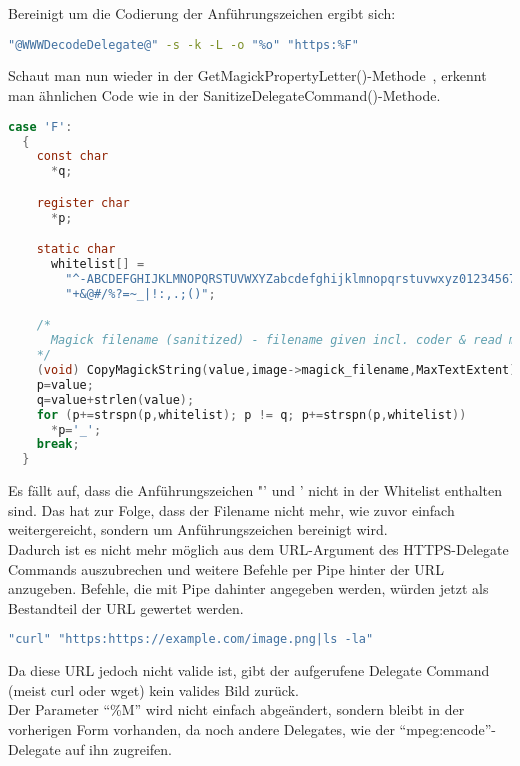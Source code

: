 Bereinigt um die Codierung der Anführungszeichen ergibt sich:

\begin{lstlisting}[firstnumber=1, language=Bash, caption=Aufgelöster https-Delegate-Befehl 6.9.3-10,label={lst:lstlisting}]
"@WWWDecodeDelegate@" -s -k -L -o "%o" "https:%F"
\end{lstlisting}
\vspace{5mm}

\newpage

Schaut man nun wieder in der GetMagickPropertyLetter()-Methode~\cite{ComareFParam},
erkennt man ähnlichen Code wie in der SanitizeDelegateCommand()-Methode.

\begin{lstlisting}[firstnumber=2610, language=C, caption=magick/property.c Gefilterte Wietergabe F-Parameter,label={lst:lstlisting}]
  case 'F':
  {
    const char
      *q;

    register char
      *p;

    static char
      whitelist[] =
        "^-ABCDEFGHIJKLMNOPQRSTUVWXYZabcdefghijklmnopqrstuvwxyz0123456789"
        "+&@#/%?=~_|!:,.;()";

    /*
      Magick filename (sanitized) - filename given incl. coder & read mods.
    */
    (void) CopyMagickString(value,image->magick_filename,MaxTextExtent);
    p=value;
    q=value+strlen(value);
    for (p+=strspn(p,whitelist); p != q; p+=strspn(p,whitelist))
      *p='_';
    break;
  }
\end{lstlisting}
\vspace{5mm}

Es fällt auf, dass die Anführungszeichen "' und ' nicht in der Whitelist enthalten sind.
Das hat zur Folge, dass der Filename nicht mehr, wie zuvor einfach weitergereicht, sondern um Anführungszeichen bereinigt wird.\\

Dadurch ist es nicht mehr möglich aus dem URL-Argument des HTTPS-Delegate Commands auszubrechen und weitere Befehle per Pipe hinter der URL anzugeben.
Befehle, die mit Pipe dahinter angegeben werden, würden jetzt als Bestandteil der URL gewertet werden.

\begin{lstlisting}[language=Bash, caption=Vereinfachtes Beispiel für HTTPS Delegate-Command nach dem Ersetzen der Platzhalter,label={lst:simpleexampleafter}]
"curl" "https:https://example.com/image.png|ls -la"
\end{lstlisting}
\vspace{5mm}

Da diese URL jedoch nicht valide ist, gibt der aufgerufene Delegate Command (meist curl oder wget) kein valides Bild zurück.\\

Der Parameter "`\%M"' wird nicht einfach abgeändert,
sondern bleibt in der vorherigen Form vorhanden, da noch andere Delegates, wie der "`mpeg:encode"'-Delegate auf ihn zugreifen.\\